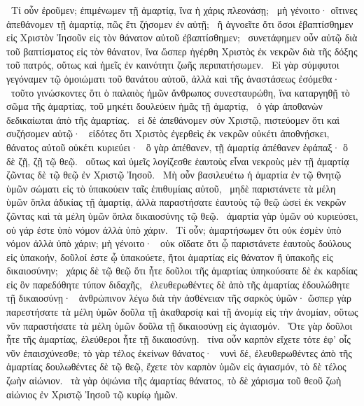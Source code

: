 ~Τί οὖν ἐροῦμεν; ἐπιμένωμεν τῇ ἁμαρτίᾳ, ἵνα ἡ χάρις πλεονάσῃ;
~μὴ γένοιτο· οἵτινες ἀπεθάνομεν τῇ ἁμαρτίᾳ, πῶς ἔτι ζήσομεν ἐν αὐτῇ;
~ἢ ἀγνοεῖτε ὅτι ὅσοι ἐβαπτίσθημεν εἰς Χριστὸν Ἰησοῦν εἰς τὸν θάνατον αὐτοῦ ἐβαπτίσθημεν;
~συνετάφημεν οὖν αὐτῷ διὰ τοῦ βαπτίσματος εἰς τὸν θάνατον, ἵνα ὥσπερ ἠγέρθη Χριστὸς ἐκ νεκρῶν διὰ τῆς δόξης τοῦ πατρός, οὕτως καὶ ἡμεῖς ἐν καινότητι ζωῆς περιπατήσωμεν.
~Εἰ γὰρ σύμφυτοι γεγόναμεν τῷ ὁμοιώματι τοῦ θανάτου αὐτοῦ, ἀλλὰ καὶ τῆς ἀναστάσεως ἐσόμεθα·
~τοῦτο γινώσκοντες ὅτι ὁ παλαιὸς ἡμῶν ἄνθρωπος συνεσταυρώθη, ἵνα καταργηθῇ τὸ σῶμα τῆς ἁμαρτίας, τοῦ μηκέτι δουλεύειν ἡμᾶς τῇ ἁμαρτίᾳ,
~ὁ γὰρ ἀποθανὼν δεδικαίωται ἀπὸ τῆς ἁμαρτίας.
~εἰ δὲ ἀπεθάνομεν σὺν Χριστῷ, πιστεύομεν ὅτι καὶ συζήσομεν αὐτῷ·
~εἰδότες ὅτι Χριστὸς ἐγερθεὶς ἐκ νεκρῶν οὐκέτι ἀποθνῄσκει, θάνατος αὐτοῦ οὐκέτι κυριεύει·
~ὃ γὰρ ἀπέθανεν, τῇ ἁμαρτίᾳ ἀπέθανεν ἐφάπαξ· ὃ δὲ ζῇ, ζῇ τῷ θεῷ.
~οὕτως καὶ ὑμεῖς λογίζεσθε ἑαυτοὺς εἶναι νεκροὺς μὲν τῇ ἁμαρτίᾳ ζῶντας δὲ τῷ θεῷ ἐν Χριστῷ Ἰησοῦ.
~Μὴ οὖν βασιλευέτω ἡ ἁμαρτία ἐν τῷ θνητῷ ὑμῶν σώματι εἰς τὸ ὑπακούειν ταῖς ἐπιθυμίαις αὐτοῦ,
~μηδὲ παριστάνετε τὰ μέλη ὑμῶν ὅπλα ἀδικίας τῇ ἁμαρτίᾳ, ἀλλὰ παραστήσατε ἑαυτοὺς τῷ θεῷ ὡσεὶ ἐκ νεκρῶν ζῶντας καὶ τὰ μέλη ὑμῶν ὅπλα δικαιοσύνης τῷ θεῷ.
~ἁμαρτία γὰρ ὑμῶν οὐ κυριεύσει, οὐ γάρ ἐστε ὑπὸ νόμον ἀλλὰ ὑπὸ χάριν.
~Τί οὖν; ἁμαρτήσωμεν ὅτι οὐκ ἐσμὲν ὑπὸ νόμον ἀλλὰ ὑπὸ χάριν; μὴ γένοιτο·
~οὐκ οἴδατε ὅτι ᾧ παριστάνετε ἑαυτοὺς δούλους εἰς ὑπακοήν, δοῦλοί ἐστε ᾧ ὑπακούετε, ἤτοι ἁμαρτίας εἰς θάνατον ἢ ὑπακοῆς εἰς δικαιοσύνην;
~χάρις δὲ τῷ θεῷ ὅτι ἦτε δοῦλοι τῆς ἁμαρτίας ὑπηκούσατε δὲ ἐκ καρδίας εἰς ὃν παρεδόθητε τύπον διδαχῆς,
~ἐλευθερωθέντες δὲ ἀπὸ τῆς ἁμαρτίας ἐδουλώθητε τῇ δικαιοσύνῃ·
~ἀνθρώπινον λέγω διὰ τὴν ἀσθένειαν τῆς σαρκὸς ὑμῶν· ὥσπερ γὰρ παρεστήσατε τὰ μέλη ὑμῶν δοῦλα τῇ ἀκαθαρσίᾳ καὶ τῇ ἀνομίᾳ εἰς τὴν ἀνομίαν, οὕτως νῦν παραστήσατε τὰ μέλη ὑμῶν δοῦλα τῇ δικαιοσύνῃ εἰς ἁγιασμόν.
~Ὅτε γὰρ δοῦλοι ἦτε τῆς ἁμαρτίας, ἐλεύθεροι ἦτε τῇ δικαιοσύνῃ.
~τίνα οὖν καρπὸν εἴχετε τότε ἐφ’ οἷς νῦν ἐπαισχύνεσθε; τὸ γὰρ τέλος ἐκείνων θάνατος·
~νυνὶ δέ, ἐλευθερωθέντες ἀπὸ τῆς ἁμαρτίας δουλωθέντες δὲ τῷ θεῷ, ἔχετε τὸν καρπὸν ὑμῶν εἰς ἁγιασμόν, τὸ δὲ τέλος ζωὴν αἰώνιον.
~τὰ γὰρ ὀψώνια τῆς ἁμαρτίας θάνατος, τὸ δὲ χάρισμα τοῦ θεοῦ ζωὴ αἰώνιος ἐν Χριστῷ Ἰησοῦ τῷ κυρίῳ ἡμῶν.

